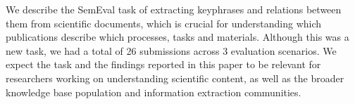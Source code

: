 We describe the SemEval task of extracting keyphrases and relations between them from scientific documents, which is crucial for understanding which publications describe which processes, tasks and materials. Although this was a new task, we had a total of 26 submissions across 3 evaluation scenarios. We expect the task and the findings reported in this paper to be relevant for researchers working on understanding scientific content, as well as the broader knowledge base population and information extraction communities.
